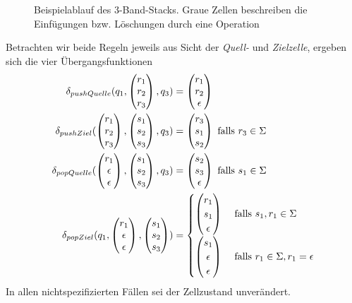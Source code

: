 \documentclass{article}
\begin{document}
\begin{figure}[h]
    \caption{Beispielablauf des 3-Band-Stacks. Graue Zellen beschreiben die Einfügungen bzw. Löschungen durch eine Operation}
\end{figure}
Betrachten wir beide Regeln jeweils aus Sicht der \emph{Quell-} und \emph{Zielzelle}, ergeben sich die vier Übergangsfunktionen
\begin{align*}
    \delta_{pushQuelle}(q_1,\begin{pmatrix}r_1\\r_2\\r_3\end{pmatrix},q_3) &= \begin{pmatrix}r_1\\r_2\\\epsilon\end{pmatrix} \\
    \delta_{pushZiel}(\begin{pmatrix}r_1\\r_2\\r_3\end{pmatrix},\begin{pmatrix}s_1\\s_2\\s_3\end{pmatrix},q_3) &= \begin{pmatrix}r_3\\s_1\\s_2\end{pmatrix} \text{ falls } r_3 \in \Sigma \\
    \delta_{popQuelle}(\begin{pmatrix}r_1\\\epsilon\\\epsilon\end{pmatrix},\begin{pmatrix}s_1\\s_2\\s_3\end{pmatrix},q_3) &= \begin{pmatrix}s_2\\s_3\\\epsilon\end{pmatrix} \text { falls } s_1 \in \Sigma \\
    \delta_{popZiel}(q_1,\begin{pmatrix}r_1\\\epsilon\\\epsilon\end{pmatrix},\begin{pmatrix}s_1\\s_2\\s_3\end{pmatrix}) &= \begin{cases}
        \begin{pmatrix}r_1\\s_1\\\epsilon\end{pmatrix} &\text { falls } s_1,r_1 \in \Sigma \\
        \begin{pmatrix}s_1\\\epsilon\\\epsilon\end{pmatrix} &\text { falls } r_1 \in \Sigma, r_1 = \epsilon
    \end{cases}
\end{align*}
In allen nichtspezifizierten Fällen sei der Zellzustand unverändert.
\end{document}
